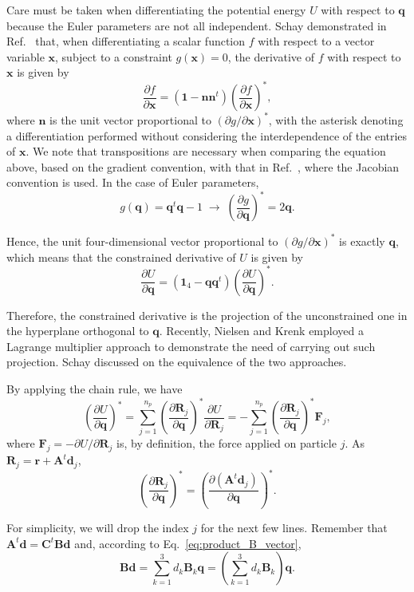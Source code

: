 \documentclass[aip,jcp,reprint,amsmath,amssymb,raggedbottom]{revtex4-1}
\newcommand{\mt}[1]{\boldsymbol{\mathbf{#1}}}           %
\newcommand{\vt}[1]{\boldsymbol{\mathbf{#1}}}           %
\newcommand{\tr}[1]{#1^t}                               %
\newcommand{\diff}[2]{\dfrac{\partial #1}{\partial #2}} %
\begin{document}
Care must be taken when differentiating the potential energy $U$ with respect to $\vt q$ because the Euler parameters are not all independent. Schay demonstrated in Ref.~\cite{Schay1995} that, when differentiating a scalar function $f$ with respect to a vector variable $\vt x$, subject to a constraint $g(\vt x) = 0$, the derivative of $f$ with respect to $\vt x$ is given by
\[
\diff{f}{\vt x} = (\vt 1 - \vt n \tr{\vt n})\left( \diff{f}{\vt x} \right)^\ast,
\]
where $\vt n$ is the unit vector proportional to $(\partial g/\partial \vt x)^\ast$, with the asterisk denoting a differentiation performed without considering the interdependence of the entries of $\vt x$. We note that transpositions are necessary when comparing the equation above, based on the gradient convention, with that in Ref.~\cite{Schay1995}, where the Jacobian convention is used. In the  case of Euler parameters,
\[
g(\vt q) = \tr{\vt q}\vt q - 1 \; \rightarrow \; \left(\diff{g}{\vt q}\right)^\ast = 2 \vt q.
\]

Hence, the unit four-dimensional vector proportional to $(\partial g/\partial \vt x)^\ast$ is exactly $\vt q$, which means that the constrained derivative of $U$ is given by
\begin{equation}
\label{eq:diff_projection}
\diff{U}{\vt q} = (\mt 1_4 - {\vt q}\tr{\vt q})\left( \diff{U}{\vt q} \right)^\ast.
\end{equation}

Therefore, the constrained derivative is the projection of the unconstrained one in the hyperplane orthogonal to $\vt q$. Recently, Nielsen and Krenk\cite{Nielsen2012} employed a Lagrange multiplier approach to demonstrate the need of carrying out such projection. Schay\cite{Schay1995, Schay1998} discussed on the equivalence of the two approaches.

By applying the chain rule, we have
\[
\left( \diff{U}{\vt q} \right)^\ast = \sum_{j=1}^{n_p} \left( \diff{\vt R_j}{\vt q} \right)^\ast \diff{U}{\vt R_j} = - \sum_{j=1}^{n_p} \left( \diff{\vt R_j}{\vt q} \right)^\ast {\vt F_j},
\]
where $\vt F_j = -\partial U/\partial \vt R_j$ is, by definition, the force applied on particle $j$. As $\vt R_j = \vt r + \tr{\mt A}\vt d_j$,
\[
\left( \diff{\vt R_j}{\vt q} \right)^\ast = \left( \diff{(\tr{\mt A}\vt d_j)}{\vt q} \right)^\ast.
\]

For simplicity, we will drop the index $j$ for the next few lines. Remember that $\tr{\mt A}\vt d = \tr{\mt C} \mt B\vt d$ and, according to Eq.~\ref{eq:product_B_vector},
\[
\mt B \vt d = \sum_{k=1}^3 d_k \mt B_k \vt q = \left( \sum_{k=1}^3 d_k \mt B_k \right) \vt q.
\]
\end{document}
